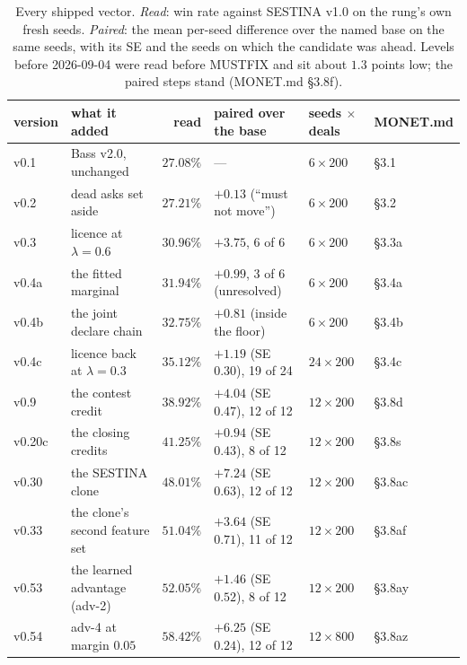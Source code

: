 \documentclass[11pt]{article}
\newcommand{\monet}{MONET.md}
\newcommand{\sect}[1]{\S#1}
\begin{document}
\begin{table}[t]
\centering
\footnotesize
\caption{Every shipped vector. \emph{Read}: win rate against SESTINA v1.0 on the rung's own fresh seeds.
\emph{Paired}: the mean per-seed difference over the named base on the same seeds, with its SE and the
seeds on which the candidate was ahead. Levels before 2026-09-04 were read before MUSTFIX and sit about
$1.3$ points low; the paired steps stand (\monet{} \sect{3.8f}).}
\label{tab:shipped}
\begin{tabular}{@{}llrlll@{}}
\toprule
version & what it added & read & paired over the base & seeds $\times$ deals & \monet{} \\
\midrule
v0.1  & Bass v2.0, unchanged              & $27.08\%$ & ---                                 & $6 \times 200$  & \sect{3.1} \\
v0.2  & dead asks set aside               & $27.21\%$ & $+0.13$ (``must not move'')        & $6 \times 200$  & \sect{3.2} \\
v0.3  & licence at $\lambda=0.6$          & $30.96\%$ & $+3.75$, 6 of 6                     & $6 \times 200$  & \sect{3.3a} \\
v0.4a & the fitted marginal               & $31.94\%$ & $+0.99$, 3 of 6 (unresolved)        & $6 \times 200$  & \sect{3.4a} \\
v0.4b & the joint declare chain           & $32.75\%$ & $+0.81$ (inside the floor)          & $6 \times 200$  & \sect{3.4b} \\
v0.4c & licence back at $\lambda=0.3$     & $35.12\%$ & $+1.19$ (SE $0.30$), 19 of 24       & $24 \times 200$ & \sect{3.4c} \\
v0.9  & the contest credit                & $38.92\%$ & $+4.04$ (SE $0.47$), 12 of 12       & $12 \times 200$ & \sect{3.8d} \\
v0.20c & the closing credits              & $41.25\%$ & $+0.94$ (SE $0.43$), 8 of 12        & $12 \times 200$ & \sect{3.8s} \\
v0.30 & the SESTINA clone                 & $48.01\%$ & $+7.24$ (SE $0.63$), 12 of 12       & $12 \times 200$ & \sect{3.8ac} \\
v0.33 & the clone's second feature set    & $51.04\%$ & $+3.64$ (SE $0.71$), 11 of 12       & $12 \times 200$ & \sect{3.8af} \\
v0.53 & the learned advantage (adv-2)     & $52.05\%$ & $+1.46$ (SE $0.52$), 8 of 12        & $12 \times 200$ & \sect{3.8ay} \\
v0.54 & adv-4 at margin $0.05$            & $58.42\%$ & $+6.25$ (SE $0.24$), 12 of 12       & $12 \times 800$ & \sect{3.8az} \\
\bottomrule
\end{tabular}
\end{table}
\end{document}
